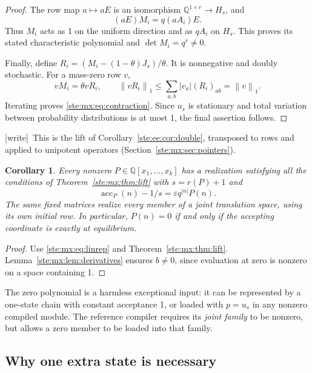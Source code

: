 \documentclass[11pt,letterpaper]{article}
\newtheorem{corollary}[theorem]{Corollary}
\theoremstyle{definition}
\theoremstyle{remark}
\newcommand{\Q}{\mathbb Q}
\newcommand{\norm}[1]{\left\lVert #1\right\rVert}
\newcommand{\acc}{\operatorname{acc}}
\newcommand{\wtag}{\textup{[write]}}
\begin{document}
\begin{proof}
The row map $a\mapsto aE$ is an isomorphism $\Q^{1\times r}\to H_s$, and
\begin{equation}\label{ste:mx:eq:conjugacy}
 (aE)M_i=q(aA_i)E.
\end{equation}
Thus $M_i$ acts as 1 on the uniform direction and as $qA_i$ on $H_s$. This
proves its stated characteristic polynomial and $\det M_i=q^r\ne0$.

Finally, define
$R_i=(M_i-(1-\theta)J_s)/\theta$. It is nonnegative and doubly stochastic.
For a mass-zero row $v$,
\[
 vM_i=\theta vR_i,\qquad
 \norm{vR_i}_1
 \leq\sum_{a,b}|v_a|(R_i)_{ab}=\norm v_1.
\]
Iterating proves \eqref{ste:mx:eq:contraction}. Since $u_s$ is stationary and total
variation between probability distributions is at most 1, the final assertion
follows.
\end{proof}

\wtag\ This is the lift of Corollary~\ref{ste:ee:cor:double}, transposed to rows and applied to unipotent operators (Section~\ref{ste:mx:sec:pointers}).


\begin{corollary}\label{ste:mx:cor:polynomial}
Every nonzero $P\in\Q[x_1,\ldots,x_k]$ has a realization satisfying all the
conditions of Theorem~\ref{ste:mx:thm:lift} with $s=r(P)+1$ and
\begin{equation}\label{ste:mx:eq:Psignal}
 \acc_P(n)-1/s=\varepsilon q^{|n|}P(n).
\end{equation}
The same fixed matrices realize every member of a joint translation space,
using its own initial row. In particular, $P(n)=0$ if and only if the accepting
coordinate is exactly at equilibrium.
\end{corollary}
\begin{proof}
Use \eqref{ste:mx:eq:linrep} and Theorem~\ref{ste:mx:thm:lift}. Lemma~\ref{ste:mx:lem:derivatives}
ensures $b\ne0$, since evaluation at zero is nonzero on a space containing 1.
\end{proof}

The zero polynomial is a harmless exceptional input: it can be represented
by a one-state chain with constant acceptance 1, or loaded with $p=u_s$ in any
nonzero compiled module. The reference compiler requires its \emph{joint
family} to be nonzero, but allows a zero member to be loaded into that family.

\subsection{Why one extra state is necessary}
\end{document}
